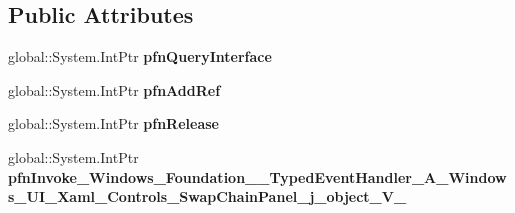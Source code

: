 \subsection*{Public Attributes}
\begin{DoxyCompactItemize}
\item 
\mbox{\label{struct_windows_1_1_foundation_1_1_typed_event_handler___a___windows___u_i___xaml___controls___swe8a58bc0b25f8af5f9c8249e14c85158_aa369288bf43f1aaddc9883a76cafe1aa}} 
global\+::\+System.\+Int\+Ptr {\bfseries pfn\+Query\+Interface}
\item 
\mbox{\label{struct_windows_1_1_foundation_1_1_typed_event_handler___a___windows___u_i___xaml___controls___swe8a58bc0b25f8af5f9c8249e14c85158_a3566aca12e3973347e3828861a972004}} 
global\+::\+System.\+Int\+Ptr {\bfseries pfn\+Add\+Ref}
\item 
\mbox{\label{struct_windows_1_1_foundation_1_1_typed_event_handler___a___windows___u_i___xaml___controls___swe8a58bc0b25f8af5f9c8249e14c85158_a576b1fa7995c58bdc360c4b88785d4ce}} 
global\+::\+System.\+Int\+Ptr {\bfseries pfn\+Release}
\item 
\mbox{\label{struct_windows_1_1_foundation_1_1_typed_event_handler___a___windows___u_i___xaml___controls___swe8a58bc0b25f8af5f9c8249e14c85158_ad6ab11e16262cd3935972deeb6454cd1}} 
global\+::\+System.\+Int\+Ptr {\bfseries pfn\+Invoke\+\_\+\+Windows\+\_\+\+Foundation\+\_\+\+\_\+\+Typed\+Event\+Handler\+\_\+\+A\+\_\+\+Windows\+\_\+\+U\+I\+\_\+\+Xaml\+\_\+\+Controls\+\_\+\+Swap\+Chain\+Panel\+\_\+j\+\_\+object\+\_\+\+V\+\_\+}
\end{DoxyCompactItemize}

